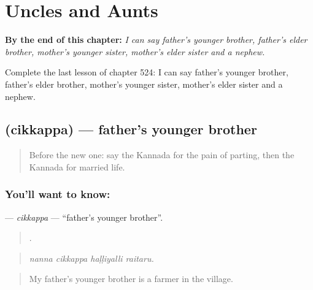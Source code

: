 
\chapter{Uncles and Aunts}
\label{ch:ka-uncles-and-aunts}

\begin{chapteropening}
\textbf{By the end of this chapter:} \emph{I can say father's younger brother, father's elder brother, mother's younger sister, mother's elder sister and a nephew.}

Complete the last lesson of chapter 524: I can say father's younger brother, father's elder brother, mother's younger sister, mother's elder sister and a nephew.
\end{chapteropening}

\section[\texorpdfstring{\kn{ಚಿಕ್ಕಪ್ಪ} (cikkappa)}{ಚಿಕ್ಕಪ್ಪ (cikkappa)}]{ (cikkappa) — father's younger brother}

\label{lesson:KA-C524-cikkappa}



\begin{quote}
Before the new one: say the Kannada for the pain of parting, then the Kannada for married life.
\end{quote}

\subsection*{You'll want to know: }
\textbf{} — \emph{cikkappa} — \textquotedblleft{}father's younger brother\textquotedblright{}.

\begin{quote}
   .
\end{quote}

\begin{quote}
\emph{nanna cikkappa haḷḷiyalli raitaru.}
\end{quote}

\begin{quote}
My father's younger brother is a farmer in the village.
\end{quote}

